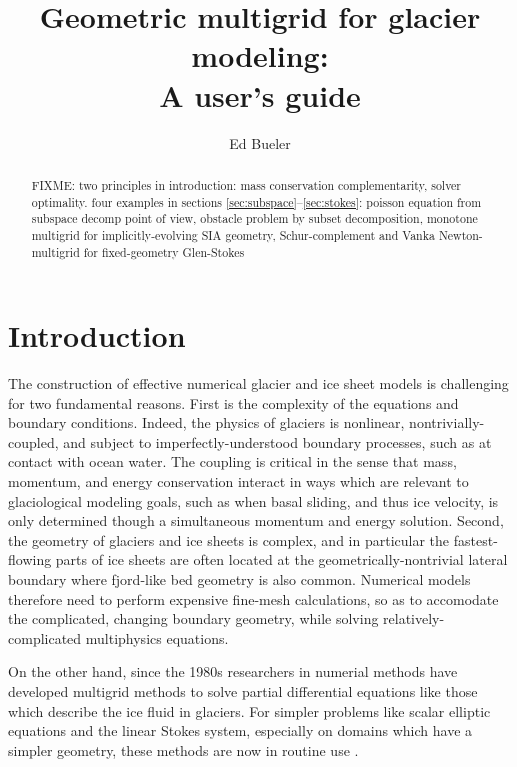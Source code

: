 \documentclass[letterpaper,final,12pt,reqno]{amsart}
\begin{document}
\title[Geometric multigrid for glacier modeling]{Geometric multigrid for glacier modeling: \\ A user's guide}

\author{Ed Bueler}

\begin{abstract} FIXME: two principles in introduction: mass conservation complementarity, solver optimality.  four examples in sections \ref{sec:subspace}--\ref{sec:stokes}: poisson equation from subspace decomp point of view, obstacle problem by subset decomposition, monotone multigrid for implicitly-evolving SIA geometry, Schur-complement and Vanka Newton-multigrid for fixed-geometry Glen-Stokes
\end{abstract}

\maketitle

\thispagestyle{empty}
\bigskip

\section{Introduction} \label{sec:intro}

The construction of effective numerical glacier and ice sheet models is challenging for two fundamental reasons.  First is the complexity of the equations and boundary conditions.  Indeed, the physics of glaciers is nonlinear, nontrivially-coupled, and subject to imperfectly-understood boundary processes, such as at contact with ocean water.  The coupling is critical in the sense that mass, momentum, and energy conservation interact in ways which are relevant to glaciological modeling goals, such as when basal sliding, and thus ice velocity, is only determined though a simultaneous momentum and energy solution.  Second, the geometry of glaciers and ice sheets is complex, and in particular the fastest-flowing parts of ice sheets are often located at the geometrically-nontrivial lateral boundary where fjord-like bed geometry is also common.  Numerical models therefore need to perform expensive fine-mesh calculations, so as to accomodate the complicated, changing boundary geometry, while solving relatively-complicated multiphysics equations.

On the other hand, since the 1980s researchers in numerial methods have developed multigrid methods to solve partial differential equations like those which describe the ice fluid in glaciers.   For simpler problems like scalar elliptic equations and the linear Stokes system, especially on domains which have a simpler geometry, these methods are now in routine use \cite{Briggsetal2000,Bueler2021,Trottenbergetal2001}.
\end{document}
